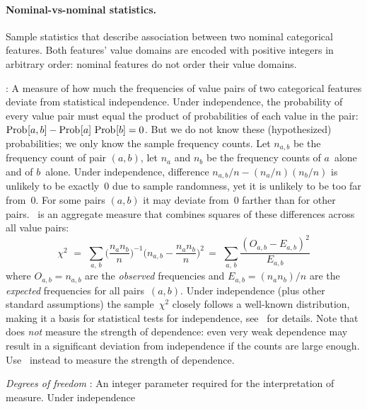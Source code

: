 \paragraph{Nominal-vs-nominal statistics.}
Sample statistics that describe association between two nominal categorical features.
Both features' value domains are encoded with positive integers in arbitrary order:
nominal features do not order their value domains.
\begin{Description}
\item[\it\NameStatChi]:
A measure of how much the frequencies of value pairs of two categorical features deviate from
statistical independence.  Under independence, the probability of every value pair must equal
the product of probabilities of each value in the pair:
$\mathop{\mathrm{Prob}\hspace{0.5pt}}\nolimits[a, b] - \mathop{\mathrm{Prob}\hspace{0.5pt}}\nolimits[a]\,\mathop{\mathrm{Prob}\hspace{0.5pt}}\nolimits[b] = 0$.  But we do not know these (hypothesized) probabilities;
we only know the sample frequency counts.  Let $n_{a,b}$ be the frequency count of pair
$(a, b)$, let $n_a$ and $n_b$ be the frequency counts of $a$~alone and of $b$~alone.  Under
independence, difference $n_{a,b}{/}n - (n_a{/}n)(n_b{/}n)$ is unlikely to be exactly~0 due
to sample randomness, yet it is unlikely to be too far from~0.  For some pairs $(a,b)$ it may
deviate from~0 farther than for other pairs.  \NameStatChi{}~is an aggregate measure that
combines squares of these differences across all value pairs:
\begin{equation*}
\chi^2 \,\,=\,\, \sum_{a,\,b} \Big(\frac{n_a n_b}{n}\Big)^{-1} \Big(n_{a,b} - \frac{n_a n_b}{n}\Big)^2
\,=\,\, \sum_{a,\,b} \frac{(O_{a,b} - E_{a,b})^2}{E_{a,b}}
\end{equation*}
where $O_{a,b} = n_{a,b}$ are the \emph{observed} frequencies and $E_{a,b} = (n_a n_b){/}n$ are
the \emph{expected} frequencies for all pairs~$(a,b)$.  Under independence (plus other standard
assumptions) the sample~$\chi^2$ closely follows a well-known distribution, making it a basis for
statistical tests for independence, see~\emph{\NameStatPChi} for details.  Note that \NameStatChi{}
does \emph{not} measure the strength of dependence: even very weak dependence may result in a
significant deviation from independence if the counts are large enough.  Use~\NameStatV{} instead
to measure the strength of dependence.
\item[\it Degrees of freedom]:
An integer parameter required for the interpretation of~\NameStatChi{} measure.  Under independence

\end{Description}
